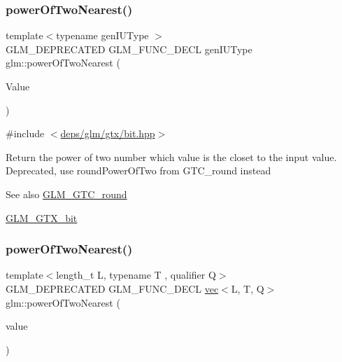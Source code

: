 \mbox{\label{group__gtx__bit_ga5f65973a5d2ea38c719e6a663149ead9}} 
\subsubsection{\texorpdfstring{power\+Of\+Two\+Nearest()}{powerOfTwoNearest()}\hspace{0.1cm}{\footnotesize\ttfamily [1/2]}}
{\footnotesize\ttfamily template$<$typename gen\+I\+U\+Type $>$ \\
G\+L\+M\+\_\+\+D\+E\+P\+R\+E\+C\+A\+T\+ED G\+L\+M\+\_\+\+F\+U\+N\+C\+\_\+\+D\+E\+CL gen\+I\+U\+Type glm\+::power\+Of\+Two\+Nearest (\begin{DoxyParamCaption}\item[{gen\+I\+U\+Type}]{Value }\end{DoxyParamCaption})}



{\ttfamily \#include $<$\hyperlink{bit_8hpp}{deps/glm/gtx/bit.\+hpp}$>$}

Return the power of two number which value is the closet to the input value. Deprecated, use round\+Power\+Of\+Two from G\+T\+C\+\_\+round instead

\begin{DoxySeeAlso}{See also}
\hyperlink{group__gtc__round}{G\+L\+M\+\_\+\+G\+T\+C\+\_\+round} 

\hyperlink{group__gtx__bit}{G\+L\+M\+\_\+\+G\+T\+X\+\_\+bit} 
\end{DoxySeeAlso}
\mbox{\label{group__gtx__bit_gac87e65d11e16c3d6b91c3bcfaef7da0b}} 
\subsubsection{\texorpdfstring{power\+Of\+Two\+Nearest()}{powerOfTwoNearest()}\hspace{0.1cm}{\footnotesize\ttfamily [2/2]}}
{\footnotesize\ttfamily template$<$length\+\_\+t L, typename T , qualifier Q$>$ \\
G\+L\+M\+\_\+\+D\+E\+P\+R\+E\+C\+A\+T\+ED G\+L\+M\+\_\+\+F\+U\+N\+C\+\_\+\+D\+E\+CL \hyperlink{structglm_1_1vec}{vec}$<$L, T, Q$>$ glm\+::power\+Of\+Two\+Nearest (\begin{DoxyParamCaption}\item[{\hyperlink{structglm_1_1vec}{vec}$<$ L, T, Q $>$ const \&}]{value }\end{DoxyParamCaption})}



